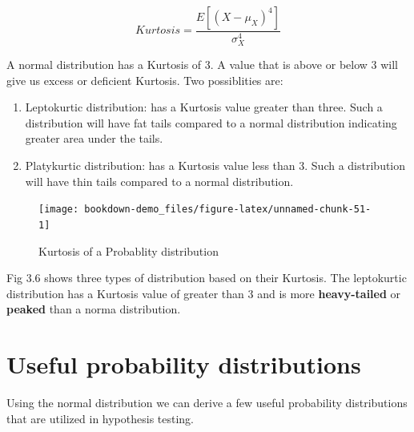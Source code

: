 \documentclass[]{book}
\theoremstyle{definition}
\theoremstyle{definition}
\theoremstyle{definition}
\theoremstyle{remark}
\begin{document}
\[Kurtosis=\frac{E[(X-\mu_X)^4]}{\sigma^4_X}\]

A normal distribution has a Kurtosis of 3. A value that is above or below 3 will give us excess or deficient Kurtosis. Two possiblities are:

\begin{enumerate}
\def\labelenumi{\alph{enumi}.}
\item
  Leptokurtic distribution: has a Kurtosis value greater than three. Such a distribution will have fat tails compared to a normal distribution indicating greater area under the tails.
\item
  Platykurtic distribution: has a Kurtosis value less than 3. Such a distribution will have thin tails compared to a normal distribution.
\end{enumerate}

\begin{figure}

{\centering \texttt{[image: bookdown-demo\_files/figure-latex/unnamed-chunk-51-1]} 

}

\caption{Kurtosis of a Probablity distribution}\label{fig:unnamed-chunk-51}
\end{figure}

Fig 3.6 shows three types of distribution based on their Kurtosis. The leptokurtic distribution has a Kurtosis value of greater than 3 and is more \textbf{heavy-tailed} or \textbf{peaked} than a norma distribution.

\hypertarget{useful-probability-distributions}{%
\section{Useful probability distributions}\label{useful-probability-distributions}}

Using the normal distribution we can derive a few useful probability distributions that are utilized in hypothesis testing.
\end{document}
